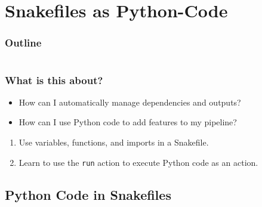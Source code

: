 \section{Snakefiles as Python-Code}

\begin{frame}
    \frametitle{Outline}
    \begin{columns}[t]
        \begin{column}{.5\textwidth}
            \tableofcontents[sections={1-9},currentsection]
        \end{column}
        \begin{column}{.5\textwidth}
            \tableofcontents[sections={10-18},currentsection]
        \end{column}
    \end{columns}
\end{frame}

\begin{frame}
  \frametitle{What is this about?}
   \begin{question}[Questions]
   	 \begin{itemize}
        \item How can I automatically manage dependencies and outputs?
        \item How can I use Python code to add features to my pipeline?
     \end{itemize}
   \end{question}
   \begin{docs}[Objectives]
   	  \begin{enumerate}
                      \item Use variables, functions, and imports in a Snakefile. 
                      \item Learn to use the \texttt{run} action to execute Python code as an action.
       \end{enumerate}
   \end{docs}
\end{frame}

\subsection{Python Code in Snakefiles}

